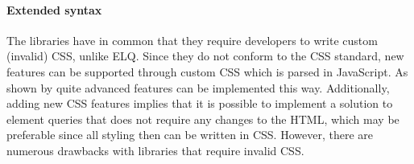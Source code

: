 \documentclass{acm_proc_article-sp}
\newcommand{\elq}{ELQ}
\newcommand{\gls}[1]{#1}
\begin{document}
  

  


  \paragraph{Extended syntax}
  The libraries \cite{eq_imp_magichtml,eq_imp_eqcss,eq_imp_prollyfill-min-width,eq_imp_localised-css,eq_imp_gss} have in common that they require developers to write custom (invalid) \gls{CSS}, unlike \elq{}.
  Since they do not conform to the \gls{CSS} standard, new features can be supported through custom \gls{CSS} which is parsed in JavaScript.
  As shown by \cite{eq_imp_eqcss,eq_imp_gss} quite advanced features can be implemented this way.
  Additionally, adding new \gls{CSS} features implies that it is possible to implement a solution to element queries that does not require any changes to the \gls{HTML}, which may be preferable since all styling then can be written in \gls{CSS}.
  However, there are numerous drawbacks with libraries that require invalid \gls{CSS}.
\end{document}
